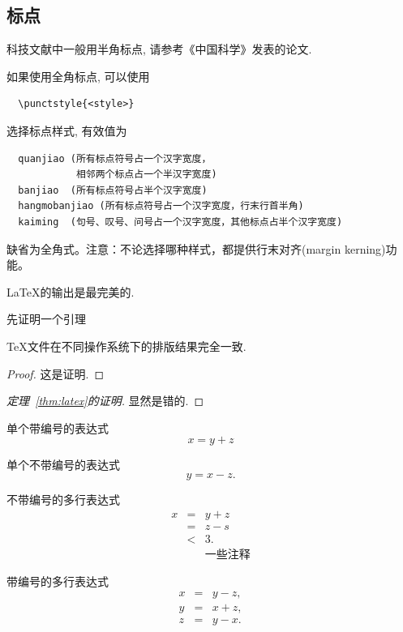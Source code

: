 \subsection{标点}
科技文献中一般用半角标点, 请参考《中国科学》发表的论文.

如果使用全角标点, 可以使用
\begin{verbatim}
  \punctstyle{<style>}
\end{verbatim}
选择标点样式, 有效值为
\begin{verbatim}
  quanjiao (所有标点符号占一个汉字宽度，
            相邻两个标点占一个半汉字宽度)
  banjiao  (所有标点符号占半个汉字宽度)
  hangmobanjiao (所有标点符号占一个汉字宽度，行末行首半角)
  kaiming  (句号、叹号、问号占一个汉字宽度，其他标点占半个汉字宽度)
\end{verbatim}
缺省为全角式。注意：不论选择哪种样式，都提供行末对齐(margin kerning)功能。



\begin{Theorem} \label{thm:latex}
\LaTeX 的输出是最完美的.
\end{Theorem}

先证明一个引理
\begin{Lemma} \label{thm:tex}
\TeX 文件在不同操作系统下的排版结果完全一致.
\end{Lemma}

\begin{proof}
这是证明.
\end{proof}


\begin{proof}[定理~\ref{thm:latex}的证明]
显然是错的.
\end{proof}

单个带编号的表达式
\begin{equation}\label{eq:a1}
x=y+z
\end{equation}

单个不带编号的表达式
\[
y=x-z.
\]

不带编号的多行表达式
\begin{eqnarray*}
x&=&y+z \\
 &=&z-s\\
 &<& 3. \\
 && \mbox{一些注释}
\end{eqnarray*}

带编号的多行表达式
\begin{eqnarray}
 x&=& y-z, \label{eq:aa1}\\
 y&=& x+z, \nonumber \\
 z&=&y-x. \label{eq:aa2}
\end{eqnarray}



